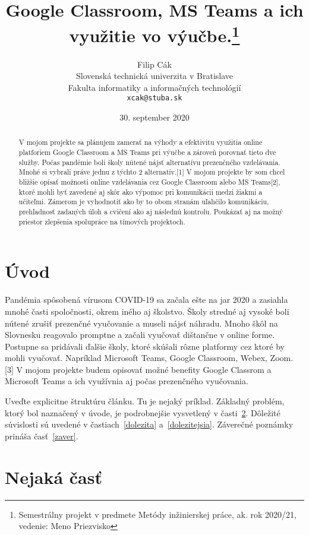 \documentclass[10pt,twoside,slovak,a4paper]{article}
\title{Google Classroom,  MS Teams a ich využitie vo výučbe.\thanks{Semestrálny projekt v predmete Metódy inžinierskej práce, ak. rok 2020/21, vedenie: Meno Priezvisko}} %
\author{Filip Cák\\[2pt]
	{\small Slovenská technická univerzita v Bratislave}\\
	{\small Fakulta informatiky a informačných technológií}\\
	{\small \texttt{xcak@stuba.sk}}
	}
\date{\small 30. september 2020} %
\begin{document}
\maketitle

\begin{abstract}
V mojom projekte sa plánujem zamerať na výhody a efektivitu využitia online platforiem Google Classroom a MS Teams pri výučbe a zároveň porovnať tieto dve služby. Počas pandémie boli školy nútené nájsť alternatívu prezenčného vzdelávania. Mnohé si vybrali práve jednu z týchto 2 alternatív.[1] V mojom projekte by som chcel bližšie opísať možnosti online vzdelávania cez Google Classroom alebo MS Teams[2], ktoré mohli byť zavedené aj skôr ako výpomoc pri komunikácii medzi žiakmi a učiteľmi. Zámerom je vyhodnotiť ako by to obom stranám uľahčilo komunikáciu, prehľadnosť zadaných úloh a cvičení ako aj následnú kontrolu. Poukázať aj na možný priestor zlepšenia spolupráce na tímových projektoch.
\end{abstract}



\section{Úvod}

Pandémia spôsobená vírusom COVID-19 sa začala ešte na jar 2020 a zasiahla mnohé časti spoločnosti, okrem iného aj školstvo. Školy stredné aj vysoké boli nútené zrušiť prezenčné vyučovanie a museli nájsť náhradu. Mnoho škôl na Slovnesku reagovalo promptne a začali vyučovať dištančne v online forme. Postupne sa pridávali ďalšie školy, ktoré skúšali rôzne platformy cez ktoré by mohli vyučovať. Napríklad Microsoft Teams, Google Classroom, Webex, Zoom. [3] V mojom projekte budem opisovať možné benefity Google Classrom a Microsoft Teams a ich využívnia aj počas prezenčného vyučovania.
 


Uveďte explicitne štruktúru článku. Tu je nejaký príklad.
Základný problém, ktorý bol naznačený v úvode, je podrobnejšie vysvetlený v časti~\ref{nejaka}.
Dôležité súvislosti sú uvedené v častiach~\ref{dolezita} a~\ref{dolezitejsia}.
Záverečné poznámky prináša časť~\ref{zaver}.



\section{Nejaká časť} \label{nejaka}
\end{document}
